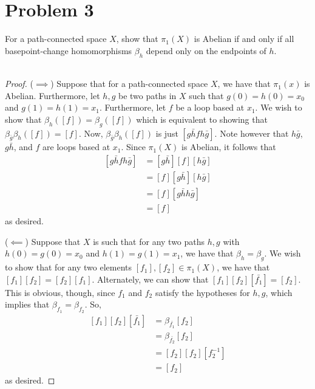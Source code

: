 \documentclass[fontsize=11pt]{scrartcl} %
\numberwithin{equation}{section} %
\numberwithin{figure}{section} %
\numberwithin{table}{section} %
\begin{document}
\section*{Problem 3}
For a path-connected space $X$, show that $\pi_1(X)$ is Abelian if and only if
all basepoint-change homomorphisms $\beta_h$ depend only on the endpoints of
$h$.
\\
\\
\begin{proof}
    ($\implies$)
    Suppose that for a path-connected space $X$, we have that $\pi_1(x)$ is
    Abelian. Furthermore, let $h,g$ be two paths in $X$ such that
    $g(0)=h(0)=x_0$ and $g(1)=h(1)=x_1$. Furthermore, let $f$ be a loop based at
    $x_1$. We wish to show that $\beta_h([f]) = \beta_g([f])$ which is equivalent to
    showing that $\beta_{\bar{g}}\beta_h([f]) = [f]$. Now,
    $\beta_{\bar{g}}\beta_h([f])$ is just $[g\bar{h}fh\bar{g}]$. Note however that
    $h\bar{g}$, $g\bar{h}$, and $f$ are loops based at $x_1$. Since $\pi_1(X)$ is
    Abelian, it follows that
    \[
        \begin{aligned}
            [g\bar{h}fh\bar{g}] &= [g\bar{h}][f][h\bar{g}]\\
            &=[f][g\bar{h}][h\bar{g}]\\
            &=[f][g\bar{h}h\bar{g}]\\
            &=[f]
        \end{aligned}
    \]
    as desired.

    ($\impliedby$)
    Suppose that $X$ is such that for any two paths $h,g$ with $h(0)=g(0)=x_0$
    and $h(1)=g(1)=x_1$, we have that $\beta_h = \beta_g$. We wish to show that
    for any two elements $[f_1],[f_2]\in \pi_1(X)$, we have that $[f_1][f_2] =
    [f_2][f_1]$. Alternately, we can show that $[f_1][f_2][\bar{f_1}]=[f_2]$.
    This is obvious, though, since $f_1$ and $f_2$ satisfy the hypotheses for
    $h,g$, which implies that $\beta_{f_1} = \beta_{f_2}$. So,
    \[
        \begin{aligned}
            [f_1][f_2][\bar{f_1}] &= \beta_{\bar{f_1}}[f_2]\\
            &= \beta_{\bar{f_2}}[f_2]\\
        &= [f_2][f_2][f_2^{-1}]\\
        &=[f_2]
        \end{aligned}
    \]
    as desired.
\end{proof}
\end{document}
